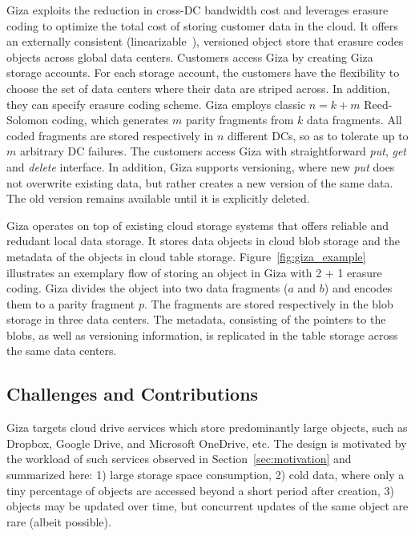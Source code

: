 Giza exploits the reduction in cross-DC bandwidth cost
and leverages erasure coding to optimize the total cost of storing customer data in the cloud.
It offers an externally consistent (linearizable~\cite{herlihy90linearizability}),
versioned object store that erasure codes objects across global data centers.
Customers access Giza by creating Giza storage accounts. For each storage
account, the customers have the flexibility to choose the set of data centers
where their data are striped across. In addition, they can specify erasure coding scheme.
Giza employs classic $n = k + m$ Reed-Solomon coding, which generates $m$ parity fragments from $k$ data fragments.
All coded fragments are stored respectively in $n$ different DCs,
so as to tolerate up to $m$ arbitrary DC failures.
The customers access Giza with straightforward {\em put}, {\em get} and {\em delete} interface. In addition, Giza supports versioning, where new {\em put} does not overwrite existing data, but rather creates a new version of the same data. The old version remains available until it is explicitly deleted.

Giza operates on top of existing cloud storage systems that offers reliable and redudant local data storage. It stores data
objects in cloud blob storage and the metadata of the objects in cloud table
storage. Figure~\ref{fig:giza_example} illustrates an exemplary flow of storing
an object in Giza with 2 + 1 erasure coding.
Giza divides the object into two data fragments ($a$ and $b$) and encodes them to a parity fragment $p$.
The fragments are stored respectively in the blob storage in three data centers. The metadata, consisting of the pointers to the
blobs, as well as versioning information, is replicated in the table storage across the
same data centers.

\subsection{Challenges and Contributions}

Giza targets cloud drive services which store predominantly large objects, such as
Dropbox, Google Drive, and Microsoft OneDrive, etc.
The design is motivated by the workload of such services observed in Section~\ref{sec:motivation}
and summarized here:
1) large storage space consumption,
2) cold data, where only a tiny percentage of objects are accessed
beyond a short period after creation,
3) objects may be updated over time, but concurrent updates of the same
object are rare (albeit possible).

